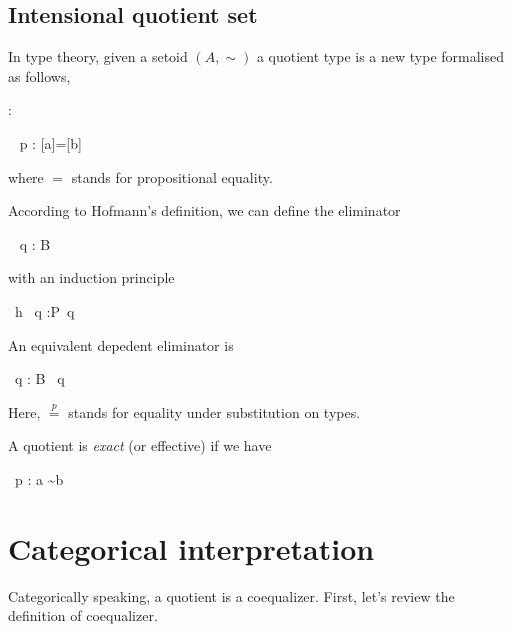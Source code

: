 \subsection{Intensional quotient set}

In type theory, given a setoid $(A,\sim)$ a quotient type is a new
type formalised as follows,

{ : \Set}




{ ~ p : [a]=[b]}

where $=$ stands for propositional equality.

According to Hofmann's\cite{hof:95:sm} definition, we can define the eliminator


{ ~ q : B}

with an induction principle

{ ~h ~q :P~q}

An equivalent depedent eliminator is

{ ~q : B~ q}

Here, $\stackrel{p}{=}$ stands for equality under substitution on types.

A quotient is \emph{exact} (or effective) if we have

{~{p} : a \sim b}



\section{Categorical interpretation}


Categorically speaking, a quotient is a coequalizer. First, let's
review the definition of coequalizer.

